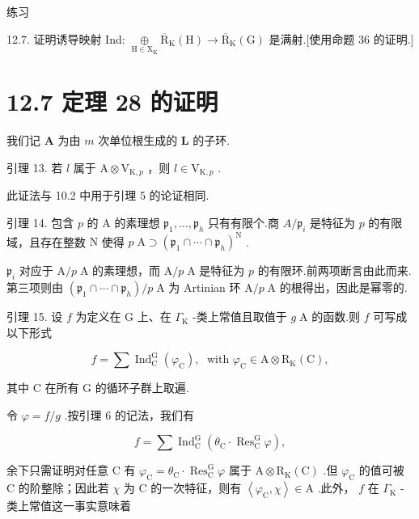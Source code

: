 \documentclass[10pt]{article}
\begin{document}
练习

12.7. 证明诱导映射 Ind: \(\underset{\mathrm{H} \in  {\mathrm{X}}_{\mathrm{K}}}{ \oplus  }{\overline{\mathrm{R}}}_{\mathrm{K}}\left( \mathrm{H}\right)  \rightarrow  {\overline{\mathrm{R}}}_{\mathrm{K}}\left( \mathrm{G}\right)\) 是满射.[使用命题 36 的证明.]

\section*{12.7 定理 28 的证明}

我们记 \(\mathbf{A}\) 为由 \(m\) 次单位根生成的 \(\mathbf{L}\) 的子环.

引理 13. 若 \(l\) 属于 \(\mathrm{A} \otimes  {\mathrm{V}}_{\mathrm{K},p}\) ，则 \(l \in  {\mathrm{V}}_{\mathrm{K},p}\) .

此证法与 10.2 中用于引理 5 的论证相同.

引理 14. 包含 \(p\) 的 \(\mathrm{A}\) 的素理想 \({\mathfrak{p}}_{1},\ldots ,{\mathfrak{p}}_{h}\) 只有有限个.商 \(A/{\mathfrak{p}}_{i}\) 是特征为 \(p\) 的有限域，且存在整数 \(\mathrm{N}\) 使得 \(p\mathrm{\;A} \supset  {\left( {\mathfrak{p}}_{1} \cap  \cdots  \cap  {\mathfrak{p}}_{h}\right) }^{\mathrm{N}}\) .

\({\mathfrak{p}}_{i}\) 对应于 \(\mathrm{A}/p\mathrm{\;A}\) 的素理想，而 \(\mathrm{A}/p\mathrm{\;A}\) 是特征为 \(p\) 的有限环.前两项断言由此而来.第三项则由 \(\left( {{\mathfrak{p}}_{1} \cap  \cdots  \cap  {\mathfrak{p}}_{h}}\right) /p\mathrm{\;A}\) 为 Artinian 环 \(\mathrm{A}/p\mathrm{\;A}\) 的根得出，因此是幂零的.

引理 15. 设 \(f\) 为定义在 \(\mathrm{G}\) 上、在 \({\Gamma }_{\mathrm{K}}\) -类上常值且取值于 \(g\mathrm{\;A}\) 的函数.则 \(f\) 可写成以下形式

\[
f = \sum {\operatorname{Ind}}_{\mathrm{C}}^{\mathrm{G}}\left( {\varphi }_{\mathrm{C}}\right) ,\;\text{ with }{\varphi }_{\mathrm{C}} \in  \mathrm{A} \otimes  {\mathrm{R}}_{\mathrm{K}}\left( \mathrm{C}\right) ,
\]

其中 \(\mathrm{C}\) 在所有 \(\mathrm{G}\) 的循环子群上取遍.

令 \(\varphi  = f/g\) .按引理 6 的记法，我们有

\[
f = \sum {\operatorname{Ind}}_{\mathrm{C}}^{\mathrm{G}}\left( {{\theta }_{\mathrm{C}} \cdot  {\operatorname{Res}}_{\mathrm{C}}^{\mathrm{G}}\varphi }\right) ,
\]

余下只需证明对任意 \(\mathrm{C}\) 有 \({\varphi }_{\mathrm{C}} = {\theta }_{\mathrm{C}} \cdot  {\operatorname{Res}}_{\mathrm{C}}^{\mathrm{G}}\varphi\) 属于 \(\mathrm{A} \otimes  {\mathrm{R}}_{\mathrm{K}}\left( \mathrm{C}\right)\) .但 \({\varphi }_{\mathrm{C}}\) 的值可被 \(\mathrm{C}\) 的阶整除；因此若 \(\chi\) 为 \(\mathrm{C}\) 的一次特征，则有 \(\left\langle  {{\varphi }_{\mathrm{C}},\chi }\right\rangle   \in  \mathrm{A}\) .此外， \(f\) 在 \({\Gamma }_{\mathrm{K}}\) -类上常值这一事实意味着
\end{document}
